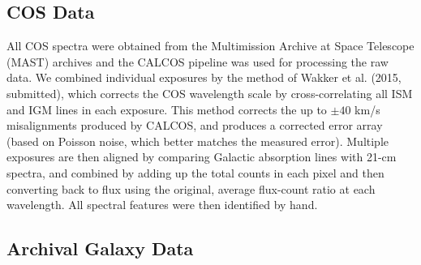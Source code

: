 \documentclass[iop]{emulateapj-rtx4}
\begin{document}
\subsection{COS Data}
All COS spectra were obtained from the Multimission Archive at Space Telescope (MAST) archives and the CALCOS pipeline was used for processing the raw data. We combined individual exposures by the method of Wakker et al. (2015, submitted), which corrects the COS wavelength scale by cross-correlating all ISM and IGM lines in each exposure. This method corrects the up to $\pm40$ km/s misalignments produced by CALCOS, and produces a corrected error array (based on Poisson noise, which better matches the measured error). Multiple exposures are then aligned by comparing Galactic absorption lines with 21-cm spectra, and combined by adding up the total counts in each pixel and then converting back to flux using the original, average flux-count ratio at each wavelength. All spectral features were then identified by hand. 



\subsection{Archival Galaxy Data}
\end{document}

